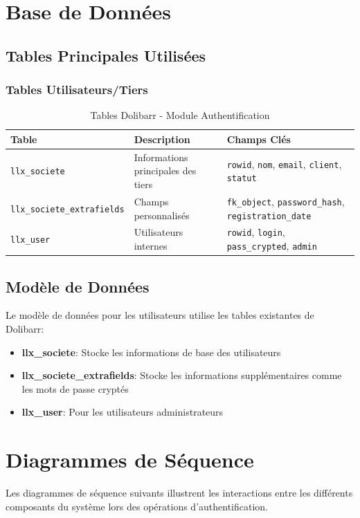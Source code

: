 \documentclass[12pt,a4paper]{report}
\begin{document}
\section{Base de Données}
\subsection{Tables Principales Utilisées}

\subsubsection{Tables Utilisateurs/Tiers}
\begin{table}[H]
\centering
\begin{tabularx}{\textwidth}{|X|X|X|}
\hline
\textbf{Table} & \textbf{Description} & \textbf{Champs Clés} \\
\hline
\texttt{llx\_societe} & Informations principales des tiers & \texttt{rowid}, \texttt{nom}, \texttt{email}, \texttt{client}, \texttt{statut} \\
\hline
\texttt{llx\_societe\_extrafields} & Champs personnalisés & \texttt{fk\_object}, \texttt{password\_hash}, \texttt{registration\_date} \\
\hline
\texttt{llx\_user} & Utilisateurs internes & \texttt{rowid}, \texttt{login}, \texttt{pass\_crypted}, \texttt{admin} \\
\hline
\end{tabularx}
\caption{Tables Dolibarr - Module Authentification}
\end{table}



\subsection{Modèle de Données}
Le modèle de données pour les utilisateurs utilise les tables existantes de Dolibarr:
\begin{itemize}
    \item \textbf{llx\_societe}: Stocke les informations de base des utilisateurs
    \item \textbf{llx\_societe\_extrafields}: Stocke les informations supplémentaires comme les mots de passe cryptés
    \item \textbf{llx\_user}: Pour les utilisateurs administrateurs
   
\end{itemize}



\section{Diagrammes de Séquence}
Les diagrammes de séquence suivants illustrent les interactions entre les différents composants du système lors des opérations d'authentification.
\end{document}
